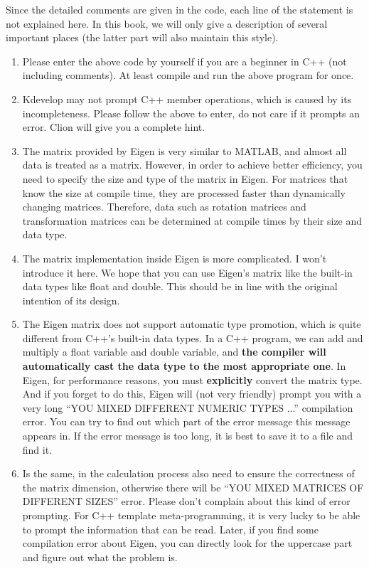 Since the detailed comments are given in the code, each line of the statement is not explained here. In this book, we will only give a description of several important places (the latter part will also maintain this style).

\begin{enumerate}
    \item Please enter the above code by yourself if you are a beginner in C++ (not including comments). At least compile and run the above program for once.
    
    \item Kdevelop may not prompt C++ member operations, which is caused by its incompleteness. Please follow the above to enter, do not care if it prompts an error. Clion will give you a complete hint.
    
    \item The matrix provided by  Eigen is very similar to MATLAB, and almost all data is treated as a matrix. However, in order to achieve better efficiency, you need to specify the size and type of the matrix in Eigen. For matrices that know the size at compile time, they are processed faster than dynamically changing matrices. Therefore, data such as rotation matrices and transformation matrices can be determined at compile times by their size and data type.
    
    \item The matrix implementation inside  Eigen is more complicated. I won't introduce it here. We hope that you can use Eigen's matrix like the built-in data types like float and double. This should be in line with the original intention of its design.
    
    \item The  Eigen matrix does not support automatic type promotion, which is quite different from C++'s built-in data types. In a C++ program, we can add and multiply a float variable and double variable, and \textbf{the compiler will automatically cast the data type to the most appropriate one}. In Eigen, for performance reasons, you must \textbf{explicitly} convert the matrix type. And if you forget to do this, Eigen will (not very friendly) prompt you with a very long ``YOU MIXED DIFFERENT NUMERIC TYPES ...'' compilation error. You can try to find out which part of the error message this message appears in. If the error message is too long, it is best to save it to a file and find it.
    
    \item Is the same, in the calculation process also need to ensure the correctness of the matrix dimension, otherwise there will be ``YOU MIXED MATRICES OF DIFFERENT SIZES'' error. Please don't complain about this kind of error prompting. For C++ template meta-programming, it is very lucky to be able to prompt the information that can be read. Later, if you find some compilation error about Eigen, you can directly look for the uppercase part and figure out what the problem is.
    

\end{enumerate}
